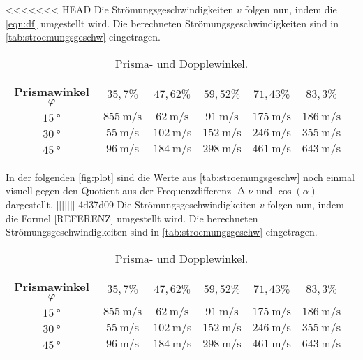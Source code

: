 \noindent
<<<<<<< HEAD
Die Strömungsgeschwindigkeiten $v$ folgen nun, indem die \autoref{eqn:df} umgestellt wird. Die berechneten Strömungsgeschwindigkeiten sind in \autoref{tab:stroemungsgeschw} eingetragen.
\begin{table}[H]
  \centering
  \caption{Prisma- und Dopplewinkel.}
  \label{tab:stroemungsgeschw}
  \begin{tabular}{c c c c c c c}
    \toprule
    Prismawinkel $\varphi$ & $35,7 \%$ & $47,62 \%$ & $59,52 \%$ & $71,43 \%$ & $83,3 \%$\\
    \midrule
    $\SI{15}{\degree}$ & $\SI{855}{\meter\per\second}$ & $\SI{62}{\meter\per\second}$ & $\SI{91}{\meter\per\second}$ & $\SI{175}{\meter\per\second}$ & $\SI{186}{\meter\per\second}$ \\
    $\SI{30}{\degree}$ & $\SI{55}{\meter\per\second}$ & $\SI{102}{\meter\per\second}$ & $\SI{152}{\meter\per\second}$ & $\SI{246}{\meter\per\second}$ & $\SI{355}{\meter\per\second}$ \\
    $\SI{45}{\degree}$ & $\SI{96}{\meter\per\second}$ & $\SI{184}{\meter\per\second}$ & $\SI{298}{\meter\per\second}$ & $\SI{461}{\meter\per\second}$ & $\SI{643}{\meter\per\second}$ \\
    \bottomrule
  \end{tabular}
\end{table}

\noindent
In der folgenden \autoref{fig:plot} sind die Werte aus \autoref{tab:stroemungsgeschw} noch einmal visuell gegen den Quotient aus der Frequenzdifferenz $\upDelta \nu$ und $\cos(\alpha)$
dargestellt.
||||||| 4d37d09
Die Strömungsgeschwindigkeiten $v$ folgen nun, indem die Formel [REFERENZ] umgestellt wird. Die berechneten Strömungsgeschwindigkeiten sind in \autoref{tab:stroemungsgeschw} eingetragen.
\begin{table}[H]
  \centering
  \caption{Prisma- und Dopplewinkel.}
  \label{tab:stroemungsgeschw}
  \begin{tabular}{c c c c c c c}
    \toprule
    Prismawinkel $\varphi$ & $35,7 \%$ & $47,62 \%$ & $59,52 \%$ & $71,43 \%$ & $83,3 \%$\\
    \midrule
    $\SI{15}{\degree}$ & $\SI{855}{\meter\per\second}$ & $\SI{62}{\meter\per\second}$ & $\SI{91}{\meter\per\second}$ & $\SI{175}{\meter\per\second}$ & $\SI{186}{\meter\per\second}$ \\
    $\SI{30}{\degree}$ & $\SI{55}{\meter\per\second}$ & $\SI{102}{\meter\per\second}$ & $\SI{152}{\meter\per\second}$ & $\SI{246}{\meter\per\second}$ & $\SI{355}{\meter\per\second}$ \\
    $\SI{45}{\degree}$ & $\SI{96}{\meter\per\second}$ & $\SI{184}{\meter\per\second}$ & $\SI{298}{\meter\per\second}$ & $\SI{461}{\meter\per\second}$ & $\SI{643}{\meter\per\second}$ \\
    \bottomrule
  \end{tabular}
\end{table}

